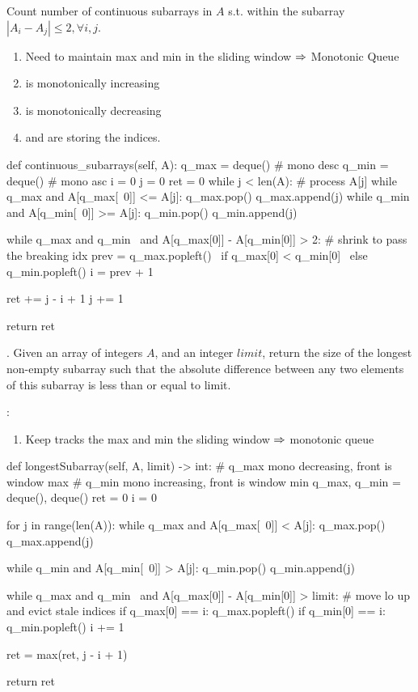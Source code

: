  Count number of continuous subarrays in $A$ s.t. within the subarray $|A_i - A_j| \leq 2, \forall i, j$.
\begin{enumerate}
\item Need to maintain max and min in the sliding window $\Rightarrow$ Monotonic Queue
\item {} is monotonically increasing
\item {} is monotonically decreasing
\item {} and  are storing the indices. 
\end{enumerate}
\begin{python}
def continuous_subarrays(self, A):
    q_max = deque()  # mono desc
    q_min = deque()  # mono asc
    i = 0
    j = 0
    ret = 0
    while j < len(A):
        # process A[j]
        while q_max and A[q_max[~0]] <= A[j]:
            q_max.pop()
        q_max.append(j)
        while q_min and A[q_min[~0]] >= A[j]:
            q_min.pop()
        q_min.append(j)
        
        while q_max and q_min \
            and A[q_max[0]] - A[q_min[0]] > 2:
            # shrink to pass the breaking idx
            prev = q_max.popleft() \
                if q_max[0] < q_min[0] \
                else q_min.popleft()
            i = prev + 1
        
        ret += j - i + 1
        j += 1
        
    return ret 
\end{python}

. Given an array of integers $A$, and an integer $limit$, return the size of the longest non-empty subarray such that the absolute difference between any two elements of this subarray is less than or equal to limit.

:
\begin{enumerate}
\item Keep tracks the max and min the sliding window $\Rightarrow$ monotonic queue
\end{enumerate}
\begin{python}
def longestSubarray(self, A, limit) -> int:
  # q_max mono decreasing, front is window max
  # q_min mono increasing, front is window min
  q_max, q_min = deque(), deque()
  ret = 0
  i = 0

  for j in range(len(A)):
    while q_max and A[q_max[~0]] < A[j]:
      q_max.pop()
    q_max.append(j)

    while q_min and A[q_min[~0]] > A[j]:
      q_min.pop()
    q_min.append(j)

    while q_max and q_min \
        and A[q_max[0]] - A[q_min[0]] > limit:
      # move lo up and evict stale indices
      if q_max[0] == i:
        q_max.popleft()
      if q_min[0] == i:
        q_min.popleft()
      i += 1

    ret = max(ret, j - i + 1)

  return ret
\end{python}



